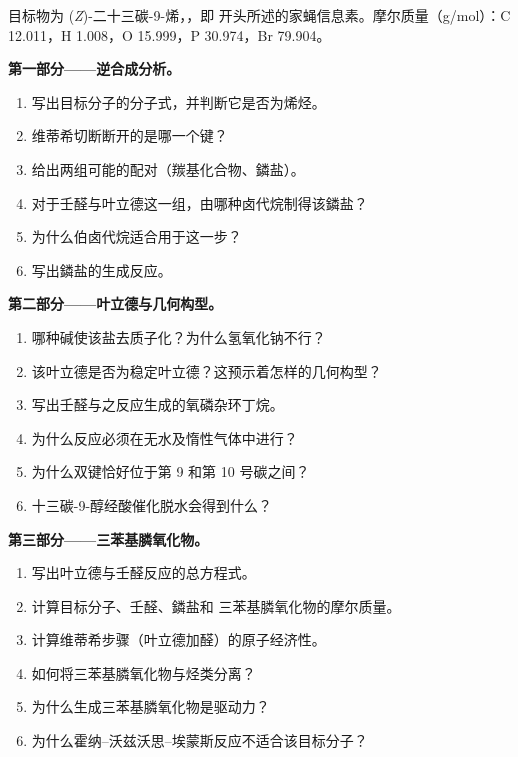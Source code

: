 \begin{problem}
\label{pb:b2:wittig:1}
目标物为 (\textit{Z})-二十三碳-9-烯，，即
开头所述的家蝇信息素。摩尔质量（\unit{g/mol}）：C 12.011，H 1.008，O 15.999，P 30.974，Br 79.904。

\medskip
\noindent\textbf{第一部分——逆合成分析。}
\begin{enumerate}
  \item 写出目标分子的分子式，并判断它是否为烯烃。
  \item 维蒂希切断断开的是哪一个键？
  \item 给出两组可能的配对（羰基化合物、鏻盐）。
  \item 对于壬醛与叶立德这一组，由哪种卤代烷制得该鏻盐？
  \item 为什么伯卤代烷适合用于这一步？
  \item 写出鏻盐的生成反应。
\end{enumerate}

\medskip
\noindent\textbf{第二部分——叶立德与几何构型。}
\begin{enumerate}[resume]
  \item 哪种碱使该盐去质子化？为什么氢氧化钠不行？
  \item 该叶立德是否为稳定叶立德？这预示着怎样的几何构型？
  \item 写出壬醛与之反应生成的氧磷杂环丁烷。
  \item 为什么反应必须在无水及惰性气体中进行？
  \item 为什么双键恰好位于第 9 和第 10 号碳之间？
  \item 十三碳-9-醇经酸催化脱水会得到什么？
\end{enumerate}

\medskip
\noindent\textbf{第三部分——三苯基膦氧化物。}
\begin{enumerate}[resume]
  \item 写出叶立德与壬醛反应的总方程式。
  \item 计算目标分子、壬醛、鏻盐和
        三苯基膦氧化物的摩尔质量。
  \item 计算维蒂希步骤（叶立德加醛）的原子经济性。
  \item 如何将三苯基膦氧化物与烃类分离？
  \item 为什么生成三苯基膦氧化物是驱动力？
  \item 为什么霍纳–沃兹沃思–埃蒙斯反应不适合该目标分子？
\end{enumerate}


\end{problem}
